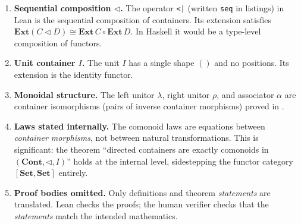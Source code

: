 \documentclass[11pt,a4paper]{article}
\begin{document}
\begin{enumerate}
\item \textbf{Sequential composition $\triangleleft$.}  The operator
  \texttt{<|} (written \texttt{seq} in listings) in Lean is the sequential composition of containers.  Its
  extension satisfies
  $\mathbf{Ext}(C \triangleleft D) \cong \mathbf{Ext}\,C \circ \mathbf{Ext}\,D$.
  In Haskell it would be a type-level composition of functors.

\item \textbf{Unit container $I$.}  The unit $I$ has a single shape $()$
  and no positions.  Its extension is the identity functor.

\item \textbf{Monoidal structure.}  The left unitor $\lambda$, right unitor
  $\rho$, and associator $\alpha$ are container isomorphisms (pairs of inverse
  container morphisms) proved in .

\item \textbf{Laws stated internally.}  The comonoid laws are equations
  between \emph{container morphisms}, not between natural transformations.
  This is significant: the theorem ``directed containers are exactly comonoids
  in $(\mathbf{Cont}, \triangleleft, I)$'' holds at the internal level,
  sidestepping the functor category $[\mathbf{Set}, \mathbf{Set}]$ entirely.

\item \textbf{Proof bodies omitted.}  Only definitions and theorem
  \emph{statements} are translated.  Lean checks the proofs; the human
  verifier checks that the \emph{statements} match the intended mathematics.
\end{enumerate}
\end{document}
